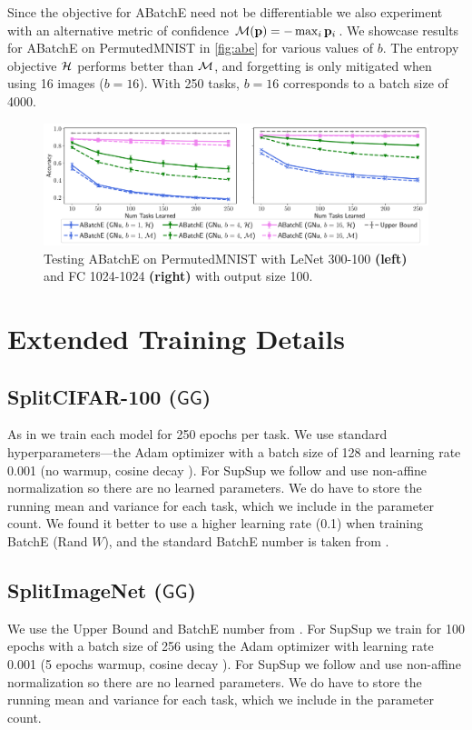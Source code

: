 \documentclass{article}
\newcommand{\ac}{SupSup\xspace}
\newcommand{\casename}[1]{\ensuremath{\mathsf{#1}}\xspace}
\begin{document}
Since the objective for ABatchE need not be differentiable we also experiment with an alternative metric of confidence $\mathcal{M}(\mathbf{p}) = -\max_i \mathbf{p}_i$.
We showcase results for ABatchE on PermutedMNIST in \autoref{fig:abe} for various values of $b$. The entropy objective $\mathcal{H}$ performs better than $\mathcal{M}$, and forgetting is only mitigated when using 16 images ($b=16$). With 250 tasks, $b=16$ corresponds to a batch size of 4000.

\begin{figure}[t]
    \centering
    \includegraphics[width=\textwidth]{figs/abe.pdf}
    \caption{Testing ABatchE on PermutedMNIST with LeNet 300-100 \textbf{(left)} and FC 1024-1024 \textbf{(right)} with output size 100.}
    \label{fig:abe}
    \vspace{-1.5em}
\end{figure}

\section{Extended Training Details} \label{sec:hyperparams}
\subsection{SplitCIFAR-100 (\casename{GG})}\label{sec:gg}

As in \cite{wen2020batchensemble} we train each model for 250 epochs per task. We use standard hyperparameters---the Adam optimizer \cite{kingma2014adam} with a batch size of 128 and learning rate 0.001 (no warmup, cosine decay \cite{cosine}). For \ac we follow \cite{ramanujan2019s} and use non-affine normalization so there are no learned parameters. We do have to store the running mean and variance for each task, which we include in the parameter count. We found it better to use a higher learning rate (0.1) when training BatchE (Rand $W$), and the standard BatchE number is taken from \cite{wen2020batchensemble}.

\subsection{SplitImageNet (\casename{GG})}
We use the Upper Bound and BatchE number from \cite{wen2020batchensemble}. For \ac we train for 100 epochs with a batch size of 256 using the Adam optimizer \cite{kingma2014adam} with learning rate 0.001 (5 epochs warmup, cosine decay \cite{cosine}). For \ac we follow \cite{ramanujan2019s} and use non-affine normalization so there are no learned parameters. We do have to store the running mean and variance for each task, which we include in the parameter count.
\end{document}

